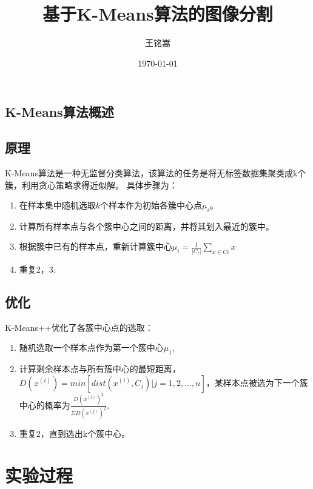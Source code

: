\documentclass{article}
\title{基于K-Means算法的图像分割}
\author{王铭嵩}
\date{\today}
\begin{document}
\maketitle
\begin{newpage}
    \section{K-Means算法概述}
    \subsection{原理}
    K-Means算法是一种无监督分类算法，该算法的任务是将无标签数据集聚类成k个簇，利用贪心策略求得近似解。
    具体步骤为：
    \begin{enumerate}
        \item 在样本集中随机选取$k$个样本作为初始各簇中心点$\mu_{i}$。
        \item 计算所有样本点与各个簇中心之间的距离，并将其划入最近的簇中。
        \item 根据簇中已有的样本点，重新计算簇中心$\mu_{i}=\frac{1}{|C_{i}|}\sum_{x\in{C{i}}}x$
        \item 重复2，3.
    \end{enumerate}
    \subsection{优化}
    K-Means++优化了各簇中心点的选取：
    \begin{enumerate}
        \item 随机选取一个样本点作为第一个簇中心$\mu_1$,
        \item 计算剩余样本点与所有簇中心的最短距离，$D(x^{(i)})=min[dist(x^{(i)},C_j)|j=1,2,...,n]$，某样本点被选为下一个簇中心的概率为$\frac{D(x^{(i)})^2}{\Sigma D(x^{(j)})^2}$,
        \item 重复2，直到选出k个簇中心。
    \end{enumerate}
\end{newpage}
\section{实验过程}
\end{document}
